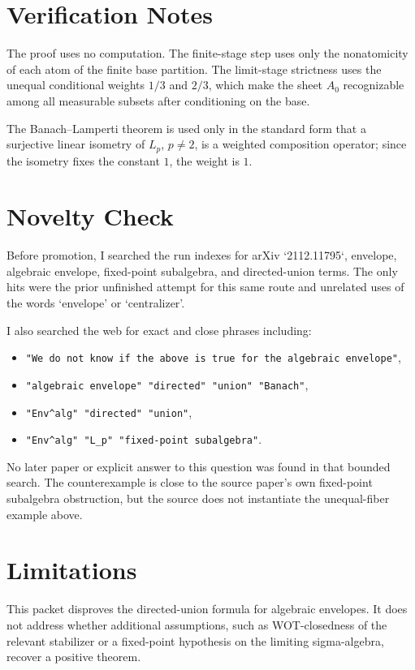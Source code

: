 \documentclass[11pt]{article}
\begin{document}
\section*{Verification Notes}

The proof uses no computation.  The finite-stage step uses only the
nonatomicity of each atom of the finite base partition.  The limit-stage
strictness uses the unequal conditional weights \(1/3\) and \(2/3\), which make
the sheet \(A_0\) recognizable among all measurable subsets after conditioning
on the base.

The Banach--Lamperti theorem is used only in the standard form that a
surjective linear isometry of \(L_p\), \(p\ne2\), is a weighted composition
operator; since the isometry fixes the constant \(1\), the weight is \(1\).

\section*{Novelty Check}

Before promotion, I searched the run indexes for arXiv `2112.11795`, envelope,
algebraic envelope, fixed-point subalgebra, and directed-union terms.  The only
hits were the prior unfinished attempt for this same route and unrelated uses
of the words `envelope' or `centralizer'.

I also searched the web for exact and close phrases including:
\begin{itemize}
\item \texttt{"We do not know if the above is true for the algebraic envelope"},
\item \texttt{"algebraic envelope" "directed" "union" "Banach"},
\item \texttt{"Env\string^alg" "directed" "union"},
\item \texttt{"Env\string^{alg}" "L\_p" "fixed-point subalgebra"}.
\end{itemize}
No later paper or explicit answer to this question was found in that bounded
search.  The counterexample is close to the source paper's own fixed-point
subalgebra obstruction, but the source does not instantiate the unequal-fiber
example above.

\section*{Limitations}

This packet disproves the directed-union formula for algebraic envelopes.  It
does not address whether additional assumptions, such as WOT-closedness of the
relevant stabilizer or a fixed-point hypothesis on the limiting sigma-algebra,
recover a positive theorem.
\end{document}
